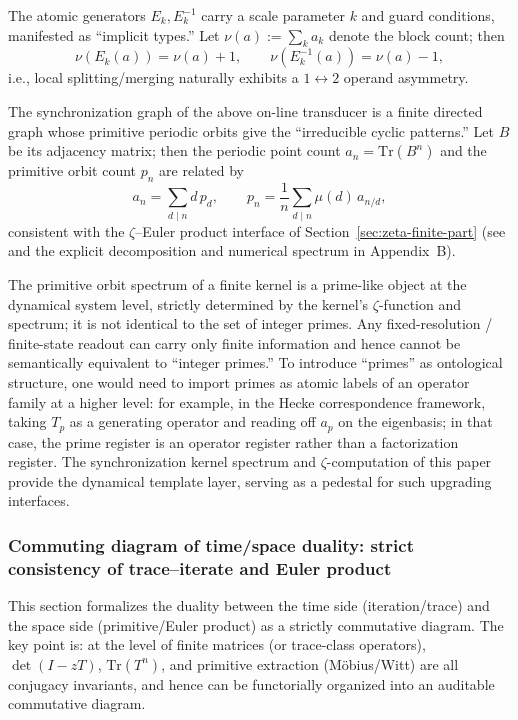 \begin{remark}
The atomic generators $E_k,E_k^{-1}$ carry a scale parameter $k$ and guard conditions, manifested as ``implicit types.'' Let $\nu(a):=\sum_k a_k$ denote the block count; then
\[
\nu(E_k(a))=\nu(a)+1,\qquad \nu(E_k^{-1}(a))=\nu(a)-1,
\]
i.e., local splitting/merging naturally exhibits a $1\leftrightarrow 2$ operand asymmetry.
\end{remark}

\begin{remark}\label{rem:primitive-shadow}
The synchronization graph of the above on-line transducer is a finite directed graph whose primitive periodic orbits give the ``irreducible cyclic patterns.'' Let $B$ be its adjacency matrix; then the periodic point count $a_n=\mathrm{Tr}(B^n)$ and the primitive orbit count $p_n$ are related by
\[
a_n=\sum_{d\mid n} d\,p_d,\qquad
p_n=\frac{1}{n}\sum_{d\mid n}\mu(d)\,a_{n/d},
\]
consistent with the $\zeta$--Euler product interface of Section~\ref{sec:zeta-finite-part} (see \cite{LindMarcus1995} and the explicit decomposition and numerical spectrum in Appendix~B).
\end{remark}

\begin{remark}\label{rem:prime-shadow-vs-primes}
The primitive orbit spectrum of a finite kernel is a prime-like object at the dynamical system level, strictly determined by the kernel's $\zeta$-function and spectrum; it is not identical to the set of integer primes. Any fixed-resolution / finite-state readout can carry only finite information and hence cannot be semantically equivalent to ``integer primes.'' To introduce ``primes'' as ontological structure, one would need to import primes as atomic labels of an operator family at a higher level: for example, in the Hecke correspondence framework, taking $T_p$ as a generating operator and reading off $a_p$ on the eigenbasis; in that case, the prime register is an operator register rather than a factorization register. The synchronization kernel spectrum and $\zeta$-computation of this paper provide the dynamical template layer, serving as a pedestal for such upgrading interfaces.
\end{remark}

\subsubsection{Commuting diagram of time/space duality: strict consistency of trace--iterate and Euler product}\label{subsec:time-space-commuting-diagram}
This section formalizes the duality between the time side (iteration/trace) and the space side (primitive/Euler product) as a strictly commutative diagram. The key point is: at the level of finite matrices (or trace-class operators), $\det(I-zT)$, $\mathrm{Tr}(T^n)$, and primitive extraction (M\"obius/Witt) are all conjugacy invariants, and hence can be functorially organized into an auditable commutative diagram.

